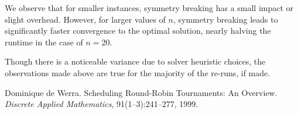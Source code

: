 \documentclass{article}
\begin{document}
We observe that for smaller instances, symmetry breaking has a small impact or slight overhead. However, for larger values of $n$, symmetry breaking leads to significantly faster convergence to the optimal solution, nearly halving the runtime in the case of $n=20$.

Though there is a noticeable variance due to solver heuristic choices, the observations made above are true for the majority of the re-runs, if made. 



\begin{thebibliography}{9}

Dominique de Werra.
\newblock Scheduling Round-Robin Tournaments: An Overview.
\newblock \emph{Discrete Applied Mathematics}, 91(1–3):241--277, 1999.
\end{thebibliography}
\end{document}
